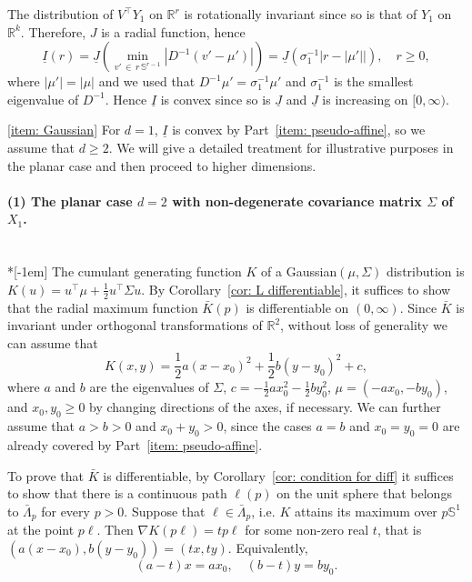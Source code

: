 \documentclass[10pt]{amsart}
\theoremstyle{definition}\newtheorem{defi}[theo]{Definition}\newtheorem{rema}[theo]{Remark}\newtheorem{exam}[theo]{Example}\newtheorem{exem}[theo]{Example}\newtheorem{nota}[theo]{Notation}
\newcommand{\ubar}[1]{\underline{#1}}
\newcommand{\Rbb}{\mathbb{R}}
\newcommand{\Sbb}{\mathbb{S}}
\begin{document}
\begin{proofc}
The distribution of $V^\top Y_1$ on $\Rbb^r$ is rotationally invariant since so is that of $Y_1$ on $\Rbb^k$. Therefore, $J$ is a radial function, hence
\[
\ubar I (r) = \ubar J \left(\min_{v'\,\in\,r\,\Sbb^{r-1}} \left|D^{-1} (v' - \mu')\right|\right) = \ubar J \left(\sigma_1^{-1}\left|r - |\mu'|\right|\right), \quad r \ge 0,
\]
where $|\mu'|=|\mu|$ and we used that $D^{-1} \mu' = \sigma_1^{-1} \mu'$ and $\sigma_1^{-1}$ is the smallest eigenvalue of $D^{-1}$. Hence $\ubar I$ is convex since so is $\ubar J$ and $\ubar J$ is increasing on $[0, \infty)$.

\eqref{item: Gaussian} For $d=1$, $\ubar I$ is convex by Part~\eqref{item: pseudo-affine}, so we assume that $d \ge 2$. We will give a detailed treatment for illustrative purposes in the planar case and then proceed to higher dimensions.

\paragraph{(1) The planar case $d=2$ with non-degenerate covariance matrix $\Sigma$ of~$X_1$.}\ \\*[-1em]
The cumulant generating function $K$ of a Gaussian$(\mu, \Sigma)$ distribution is\linebreak$K(u)= u^\top \mu + \frac12 u^\top \Sigma u$. By Corollary~\ref{cor: L differentiable}, it suffices to show that the radial maximum function $\bar K(p)$ is differentiable on $(0, \infty)$. Since $\bar K$ is invariant under orthogonal transformations of $\Rbb^2$, without loss of generality we can assume that
\[
K(x,y)=\frac12 a(x-x_0)^2+ \frac12 b(y-y_0)^2 + c,
\]
where $a$ and $b$ are the eigenvalues of $\Sigma$, $c=-\frac12 a x_0^2 - \frac12 b y_0^2$, $\mu = (-ax_0, -by_0)$, and $x_0, y_0 \ge 0$ by changing directions of the axes, if necessary. We can further assume that $a > b>0$ and $x_0 + y_0>0$, since the cases $a=b$ and $x_0=y_0=0$ are already covered by Part~\eqref{item: pseudo-affine}.

To prove that $\bar K$ is differentiable, by Corollary~\ref{cor: condition for diff} it suffices to show that there is a continuous path $\ell(p)$ on the unit sphere that belongs to $\bar \Lambda_p $ for every $p>0$. Suppose that $\ell \in \bar \Lambda_p$, i.e. $K$ attains its maximum over $p \Sbb^1$ at the point $p \ell$. Then $\nabla K(p \ell) = t p\ell$ for some non-zero real $t$, that is $(a(x-x_0),b(y-y_0))= (t x,ty)$. Equivalently,
\begin{equation}\label{eq:hyperbola polynom}
(a-t) x = a x_0, \quad (b-t) y = b y_0.
\end{equation}


\end{proofc}
\end{document}
